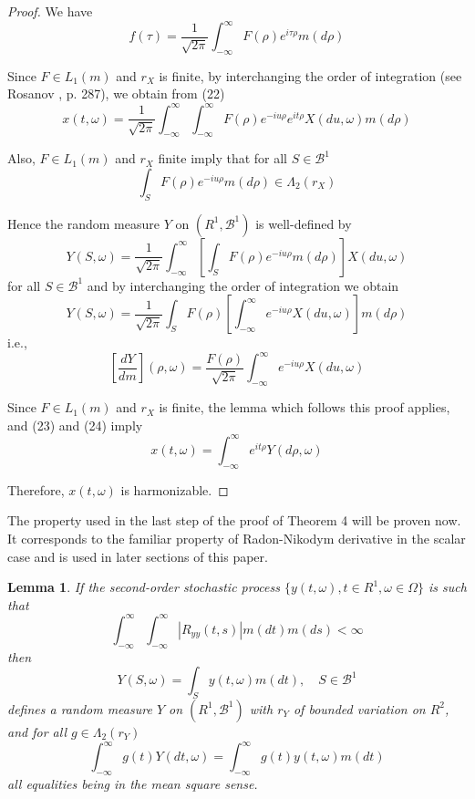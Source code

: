 \documentclass{article}
\newtheorem{lemma}{Lemma}
\begin{document}
\begin{proof}
We have
\[
f(\tau)=\frac{1}{\sqrt{2 \pi}} \int_{-\infty}^{\infty} F(\rho) e^{i \tau \rho} m(d \rho)
\]

Since $F \in L_{1}(m)$ and $r_{X}$ is finite, by interchanging the order of integration (see Rosanov \cite{rosanov1959}, p. 287), we obtain from (22)
\[
x(t, \omega)=\frac{1}{\sqrt{2 \pi}} \int_{-\infty}^{\infty} \int_{-\infty}^{\infty} F(\rho) e^{-i u \rho} e^{i t \rho} X(d u, \omega) m(d \rho)
\]

Also, $F \in L_{1}(m)$ and $r_{X}$ finite imply that for all $S \in \mathscr{B}^{1}$
\[
\int_{S} F(\rho) e^{-i u \rho} m(d \rho) \in \Lambda_{2}(r_{X})
\]

Hence the random measure $Y$ on $(R^{1}, \mathscr{B}^{1})$ is well-defined by
\[
Y(S, \omega)=\frac{1}{\sqrt{2 \pi}} \int_{-\infty}^{\infty}\left[\int_{S} F(\rho) e^{-i u \rho} m(d \rho)\right] X(d u, \omega)
\]
for all $S \in \mathscr{B}^{1}$ and by interchanging the order of integration we obtain
\[
Y(S, \omega)=\frac{1}{\sqrt{2 \pi}} \int_{S} F(\rho)\left[\int_{-\infty}^{\infty} e^{-i u \rho} X(d u, \omega)\right] m(d \rho)
\]
i.e.,
\[
\left[\frac{d Y}{d m}\right](\rho, \omega)=\frac{F(\rho)}{\sqrt{2 \pi}} \int_{-\infty}^{\infty} e^{-i u \rho} X(d u, \omega)
\]

Since $F \in L_{1}(m)$ and $r_{X}$ is finite, the lemma which follows this proof applies, and (23) and (24) imply
\[
x(t, \omega)=\int_{-\infty}^{\infty} e^{i t \rho} Y(d \rho, \omega)
\]

Therefore, $x(t, \omega)$ is harmonizable.
\end{proof}

The property used in the last step of the proof of Theorem 4 will be proven now. It corresponds to the familiar property of Radon-Nikodym derivative in the scalar case and is used in later sections of this paper.

\begin{lemma}
If the second-order stochastic process $\{y(t, \omega), t \in R^{1}, \omega \in \Omega\}$ is such that
\[
\int_{-\infty}^{\infty} \int_{-\infty}^{\infty} |R_{y y}(t, s)| m(d t) m(d s)<\infty
\]
then
\[
Y(S, \omega)=\int_{S} y(t, \omega) m(d t), \quad S \in \mathscr{B}^{1}
\]
defines a random measure $Y$ on $(R^{1}, \mathscr{B}^{1})$ with $r_{Y}$ of bounded variation on $R^{2}$, and for all $g \in \Lambda_{2}(r_{Y})$
\[
\int_{-\infty}^{\infty} g(t) Y(d t, \omega)=\int_{-\infty}^{\infty} g(t) y(t, \omega) m(d t)
\]
all equalities being in the mean square sense.
\end{lemma}
\end{document}
